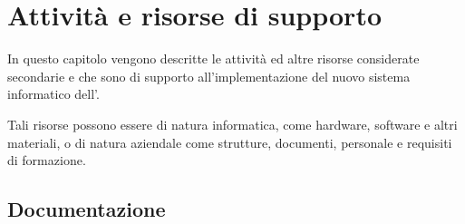 \chapter{Attività e risorse di supporto}\label{ch:supporto}

In questo capitolo vengono descritte le attività ed altre risorse considerate secondarie e che sono di supporto all'implementazione del nuovo sistema informatico dell'\istituto.

Tali risorse possono essere di natura informatica, come hardware, software e altri materiali, o di natura aziendale come strutture, documenti, personale e requisiti di formazione.

\section{Documentazione}

